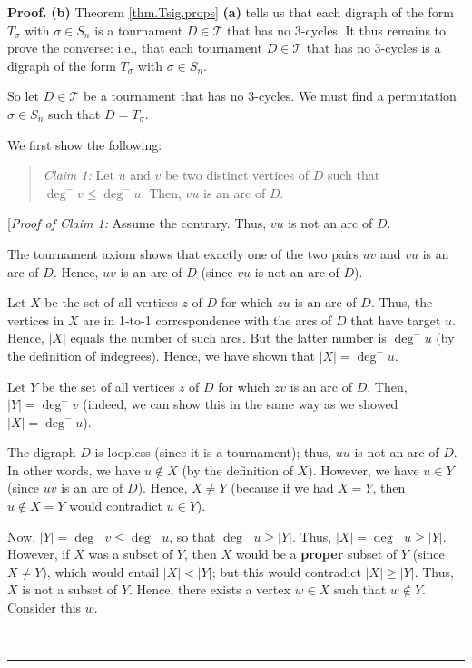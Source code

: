 \documentclass[numbers=enddot,12pt,final,onecolumn,notitlepage]{scrartcl}%
\numberwithin{exer}{subsection}
\theoremstyle{definition}
\newenvironment{statement}{\begin{quote}}{\end{quote}}
\newenvironment{proof}[1][Proof]{\noindent\textbf{#1.} }{\ \rule{0.5em}{0.5em}}
\begin{document}
\begin{proof}
\textbf{(b)} Theorem \ref{thm.Tsig.props} \textbf{(a)} tells us that each
digraph of the form $T_{\sigma}$ with $\sigma\in S_{n}$ is a tournament
$D\in\mathcal{T}$ that has no $3$-cycles. It thus remains to prove the
converse: i.e., that each tournament $D\in\mathcal{T}$ that has no $3$-cycles
is a digraph of the form $T_{\sigma}$ with $\sigma\in S_{n}$.

So let $D\in\mathcal{T}$ be a tournament that has no $3$-cycles. We must find
a permutation $\sigma\in S_{n}$ such that $D=T_{\sigma}$.

We first show the following:

\begin{statement}
\textit{Claim 1:} Let $u$ and $v$ be two distinct vertices of $D$ such that
$\deg^{-}v\leq\deg^{-}u$. Then, $vu$ is an arc of $D$.
\end{statement}

[\textit{Proof of Claim 1:} Assume the contrary. Thus, $vu$ is not an arc of
$D$.

The tournament axiom shows that exactly one of the two pairs $uv$ and $vu$ is
an arc of $D$. Hence, $uv$ is an arc of $D$ (since $vu$ is not an arc of $D$).

Let $X$ be the set of all vertices $z$ of $D$ for which $zu$ is an arc of $D$.
Thus, the vertices in $X$ are in 1-to-1 correspondence with the arcs of $D$
that have target $u$. Hence, $\left\vert X\right\vert $ equals the number of
such arcs. But the latter number is $\deg^{-}u$ (by the definition of
indegrees). Hence, we have shown that $\left\vert X\right\vert =\deg^{-}u$.

Let $Y$ be the set of all vertices $z$ of $D$ for which $zv$ is an arc of $D$.
Then, $\left\vert Y\right\vert =\deg^{-}v$ (indeed, we can show this in the
same way as we showed $\left\vert X\right\vert =\deg^{-}u$).

The digraph $D$ is loopless (since it is a tournament); thus, $uu$ is not an
arc of $D$. In other words, we have $u\notin X$ (by the definition of $X$).
However, we have $u\in Y$ (since $uv$ is an arc of $D$). Hence, $X\neq Y$
(because if we had $X=Y$, then $u\notin X=Y$ would contradict $u\in Y$).

Now, $\left\vert Y\right\vert =\deg^{-}v\leq\deg^{-}u$, so that $\deg^{-}%
u\geq\left\vert Y\right\vert $. Thus, $\left\vert X\right\vert =\deg^{-}%
u\geq\left\vert Y\right\vert $. However, if $X$ was a subset of $Y$, then $X$
would be a \textbf{proper} subset of $Y$ (since $X\neq Y$), which would entail
$\left\vert X\right\vert <\left\vert Y\right\vert $; but this would contradict
$\left\vert X\right\vert \geq\left\vert Y\right\vert $. Thus, $X$ is not a
subset of $Y$. Hence, there exists a vertex $w\in X$ such that $w\notin Y$.
Consider this $w$.


\end{proof}
\end{document}
